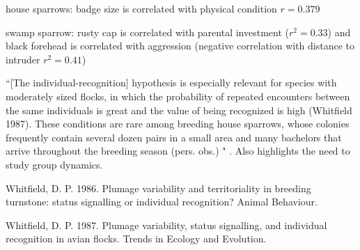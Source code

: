house sparrows: badge size is correlated with physical condition $r=0.379$ \cite{Veiga:1993fk}

swamp sparrow: rusty cap is correlated with parental investment ($r^2=0.33$) and black forehead is correlated with aggression (negative correlation with distance to intruder $r^2=0.41$) \cite{Olsen:2010uq}

``[The individual-recognition] hypothesis is especially relevant for species with moderately sized flocks, in which the probability of repeated encounters between the same individuals is great and the value of being recognized is high (Whitfield 1987). These conditions are rare among breeding house sparrows, whose colonies frequently contain several dozen pairs in a small area and many bachelors that arrive throughout the breeding season (pers. obs.) " \cite{Veiga:1993fk}. Also highlights the need to study group dynamics.

Whitfield, D. P. 1986. Plumage variability and territoriality in breeding turnstone: status signalling or individual recognition? Animal Behaviour.

Whitfield, D. P. 1987. Plumage variability, status signalling, and individual recognition in avian flocks. Trends in Ecology and Evolution.




\newpage



